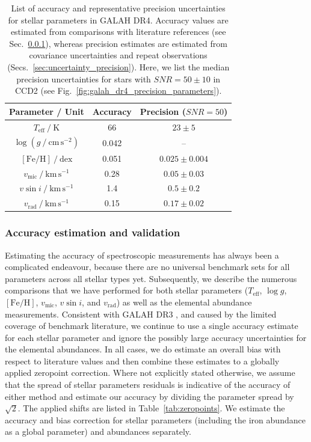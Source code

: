 \documentclass[
  journal=pasa,
  manuscript=research-paper, %
  year=2024,
  volume=37
]{cup-journal}
\newcommand{\Teff}{$T_\mathrm{eff}$\xspace}
\newcommand{\logg}{$\log g$\xspace}
\newcommand{\feh}{$\mathrm{[Fe/H]}$\xspace}
\newcommand{\vmic}{$v_\mathrm{mic}$\xspace}
\newcommand{\vsini}{$v \sin i$\xspace}
\newcommand{\vrad}{$v_\mathrm{rad}$\xspace}
\begin{document}
\begin{table}[ht]
\centering
\caption{List of accuracy and representative precision uncertainties for stellar parameters in GALAH DR4. Accuracy values are estimated from comparisons with literature references (see Sec.~\ref{sec:uncertainty_accuracy}), whereas precision estimates are estimated from covariance uncertainties and repeat observations (Secs.~\ref{sec:uncertainty_precision}). Here, we list the median precision uncertainties for stars with $SNR = 50 \pm 10$ in CCD2 (see Fig.~\ref{fig:galah_dr4_precision_parameters}).}
\label{tab:accuracy_precision}
\begin{tabular}{ccc}
\hline \hline
Parameter / Unit & Accuracy & Precision ($SNR = 50$)\\
\hline
$T_\text{eff}~/~\mathrm{K}$          & 66     & $23 \pm 5$ \\
$\log (g~/~\mathrm{cm\,s^{-2}})$     &  0.042 & -- \\
$\mathrm{[Fe/H]}~/~\mathrm{dex}$     &  0.051 & $0.025 \pm 0.004$ \\
$v_\text{mic}~/~\mathrm{km\,s^{-1}}$ &  0.28  & $0.05 \pm 0.03$ \\
$v \sin i~/~\mathrm{km\,s^{-1}}$     &  1.4   & $0.5 \pm 0.2$ \\
$v_\text{rad}~/~\mathrm{km\,s^{-1}}$ &  0.15  & $0.17 \pm 0.02$ \\
\hline
\end{tabular}
\end{table}

\subsubsection{Accuracy estimation and validation} \label{sec:uncertainty_accuracy}

Estimating the accuracy of spectroscopic measurements has always been a complicated endeavour, because there are no universal benchmark sets for all parameters across all stellar types yet. Subsequently, we describe the numerous comparisons that we have performed for both stellar parameters (\Teff, \logg, \feh, \vmic, \vsini, and \vrad) as well as the elemental abundance measurements. Consistent with GALAH DR3 \citep{Buder2021}, and caused by the limited coverage of benchmark literature, we continue to use a single accuracy estimate for each stellar parameter and ignore the possibly large accuracy uncertainties for the elemental abundances. In all cases, we do estimate an overall bias with respect to literature values and then combine these estimates to a globally applied zeropoint correction. Where not explicitly stated otherwise, we assume that the spread of stellar parameters residuals is indicative of the accuracy of either method and estimate our accuracy by dividing the parameter spread by $\sqrt{2}$. The applied shifts are listed in Table~\ref{tab:zeropoints}. We estimate the accuracy and bias correction for stellar parameters (including the iron abundance as a global parameter) and abundances separately.
\end{document}
